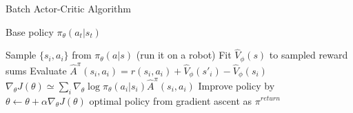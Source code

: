 \begin{algorithm}[t!]
\caption{Batch Actor-Critic Algorithm}
\begin{algorithmic}[1]
\label{alg:batchac}
\REQUIRE Base policy $\pi_\theta(a_t|s_t)$

    \STATE Sample $\{s_i,a_i\}$ from $\pi_\theta(a|s)$ (run it on a robot)
    \STATE Fit $\hat{V}_\phi(s)$ to sampled reward sums
    \STATE Evaluate $\hat{A}^\pi(s_i,a_i) = r(s_i,a_i)+\hat{V}_\phi(s'_i)-\hat{V}_\phi(s_i)$
    \STATE $\nabla_\theta J(\theta) \simeq \sum_i\nabla_\theta\log \pi_\theta(a_i|s_i)\hat{A}^\pi(s_i,a_i)$
    \STATE Improve policy by $\theta \leftarrow \theta + \alpha\nabla_\theta J(\theta)$
\ENDWHILE
\RETURN optimal policy from gradient ascent as $\pi^{return}$
\end{algorithmic}
\end{algorithm}